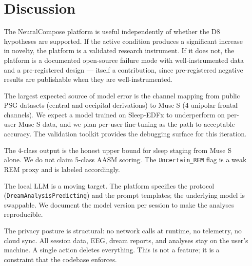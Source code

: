 \section{Discussion}
\label{sec:discussion}


The NeuralCompose platform is useful independently of whether the D8
hypotheses are supported. If the active condition produces a significant
increase in novelty, the platform is a validated research instrument. If
it does not, the platform is a documented open-source failure mode with
well-instrumented data and a pre-registered design --- itself a
contribution, since pre-registered negative results are publishable when
they are well-instrumented.

The largest expected source of model error is the channel mapping from
public PSG datasets (central and occipital derivations) to Muse S (4
unipolar frontal channels). We expect a model trained on Sleep-EDFx to
underperform on per-user Muse S data, and we plan per-user fine-tuning
as the path to acceptable accuracy. The validation toolkit provides the
debugging surface for this iteration.

The 4-class output is the honest upper bound for sleep staging from Muse
S alone. We do not claim 5-class AASM scoring. The \texttt{Uncertain\_REM}
flag is a weak REM proxy and is labeled accordingly.

The local LLM is a moving target. The platform specifies the protocol
(\texttt{DreamAnalysisPredicting}) and the prompt templates; the
underlying model is swappable. We document the model version per session
to make the analyses reproducible.

The privacy posture is structural: no network calls at runtime, no
telemetry, no cloud sync. All session data, EEG, dream reports, and
analyses stay on the user's machine. A single action deletes everything.
This is not a feature; it is a constraint that the codebase enforces.
